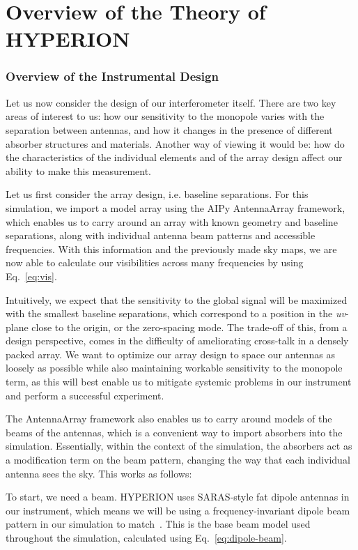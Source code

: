 \chapter{Overview of the Theory of HYPERION}

\subsection{Overview of the Instrumental Design}

Let us now consider the design of our interferometer itself. There are two key 
areas of interest to us: how our sensitivity to the monopole varies with the 
separation between antennas, and how it changes in the presence of different 
absorber structures and materials. Another way of viewing it would be: how do 
the characteristics of the individual elements and of the array design affect 
our ability to make this measurement.

Let us first consider the array design, i.e. baseline separations. For this 
simulation, we import a model array using the AIPy AntennaArray framework, 
which enables us to carry around an array with known geometry and baseline 
separations, along with individual antenna beam patterns and accessible 
frequencies. With this information and the previously made sky maps, we are now 
able to calculate our visibilities across many frequencies by using 
Eq.~\eqref{eq:vis}.

Intuitively, we expect that the sensitivity to the global signal will be 
maximized with the smallest baseline separations, which correspond to a 
position in the \emph{uv}-plane close to the origin, or the zero-spacing mode.  
The trade-off of this, from a design perspective, comes in the difficulty of 
ameliorating cross-talk in a densely packed array. We want to optimize our 
array design to space our antennas as loosely as possible while also 
maintaining workable sensitivity to the monopole term, as this will best enable 
us to mitigate systemic problems in our instrument and perform a successful 
experiment.

The AntennaArray framework also enables us to carry around models of the beams 
of the antennas, which is a convenient way to import absorbers into the 
simulation. Essentially, within the context of the simulation, the absorbers 
act as a modification term on the beam pattern, changing the way that each 
individual antenna sees the sky. This works as follows:

To start, we need a beam. HYPERION uses SARAS-style fat dipole antennas in our 
instrument, which means we will be using a frequency-invariant dipole beam 
pattern in our simulation to match~\citep{patra2013}. This is the base beam 
model used throughout the simulation, calculated using 
Eq.~\eqref{eq:dipole-beam}.

